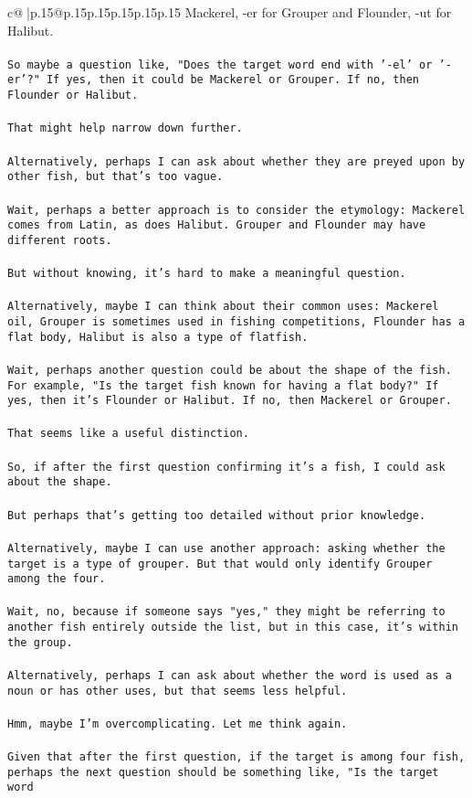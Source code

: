 \documentclass{article}
\begin{document}
{\begin{supertabular}{c@{$\;$}|p{.15\linewidth}@{}p{.15\linewidth}p{.15\linewidth}p{.15\linewidth}p{.15\linewidth}p{.15\linewidth}}
{{{Mackerel, -er for Grouper and Flounder, -ut for Halibut.\\ \tt \\ \tt So maybe a question like, "Does the target word end with '-el' or '-er'?" If yes, then it could be Mackerel or Grouper. If no, then Flounder or Halibut.\\ \tt \\ \tt That might help narrow down further.\\ \tt \\ \tt Alternatively, perhaps I can ask about whether they are preyed upon by other fish, but that's too vague.\\ \tt \\ \tt Wait, perhaps a better approach is to consider the etymology: Mackerel comes from Latin, as does Halibut. Grouper and Flounder may have different roots.\\ \tt \\ \tt But without knowing, it's hard to make a meaningful question.\\ \tt \\ \tt Alternatively, maybe I can think about their common uses: Mackerel oil, Grouper is sometimes used in fishing competitions, Flounder has a flat body, Halibut is also a type of flatfish.\\ \tt \\ \tt Wait, perhaps another question could be about the shape of the fish. For example, "Is the target fish known for having a flat body?" If yes, then it's Flounder or Halibut. If no, then Mackerel or Grouper.\\ \tt \\ \tt That seems like a useful distinction.\\ \tt \\ \tt So, if after the first question confirming it's a fish, I could ask about the shape.\\ \tt \\ \tt But perhaps that's getting too detailed without prior knowledge.\\ \tt \\ \tt Alternatively, maybe I can use another approach: asking whether the target is a type of grouper. But that would only identify Grouper among the four.\\ \tt \\ \tt Wait, no, because if someone says "yes," they might be referring to another fish entirely outside the list, but in this case, it's within the group.\\ \tt \\ \tt Alternatively, perhaps I can ask about whether the word is used as a noun or has other uses, but that seems less helpful.\\ \tt \\ \tt Hmm, maybe I'm overcomplicating. Let me think again.\\ \tt \\ \tt Given that after the first question, if the target is among four fish, perhaps the next question should be something like, "Is the target word }}}
\end{supertabular}}
\end{document}
